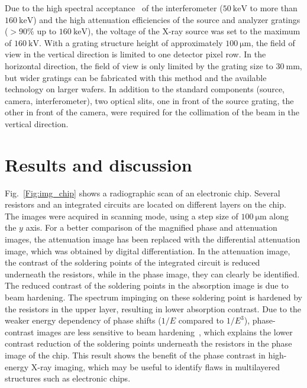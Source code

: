 \documentclass{pnastwo}
\begin{document}
\begin{article}
Due to the high spectral acceptance~\cite{Weitkamp2005,Thuering2013c} of the
interferometer ($\SI{50}{\kilo\electronvolt}$ to
more than $\SI{160}{\kilo\electronvolt}$) and the high attenuation efficiencies of
the source and analyzer gratings ($>90\%$ up to
$\SI{160}{\kilo\electronvolt}$), the voltage of the X-ray source was set to
the maximum of $\SI{160}{\kilo\volt}$. With a grating structure height of
approximately $\SI{100}{\micro \metre}$, the field of view in the vertical
direction is limited to one detector pixel row. In the horizontal direction,
the field of view is only limited by the grating size to
$\SI{30}{\milli\metre}$, but wider gratings can be fabricated with this
method and the available technology on larger wafers. In addition to the standard components (source,
camera, interferometer), two optical slits, one in front of the source
grating, the other in front of the camera, were required for the collimation
of the beam in the vertical direction. 

\section{Results and discussion}
Fig.~\ref{Fig:img_chip} shows a radiographic scan of an electronic chip.
Several resistors and an integrated circuits are located on different layers
on the chip. The images were acquired in scanning mode, using a step size of
$\SI{100}{\micro \metre}$ along the $y$ axis. For a better comparison of the
magnified phase and attenuation images, the attenuation image has been
replaced with the differential attenuation image, which was obtained by
digital differentiation. In the attenuation image, the contrast of the soldering points of
the integrated circuit is reduced underneath the resistors, while in
the phase image, they can clearly be identified. The reduced contrast of the 
soldering points in the absorption image is due to beam hardening. The spectrum
impinging on these soldering point is hardened by the resistors in the upper
layer, resulting in lower absorption contrast. Due to the weaker energy
dependency of phase shifts ($1/E$ compared to $1/E^3$), phase-contrast images
are less sensitive to beam hardening~\cite{Chabior2011a}, which explains the
lower contrast reduction of the soldering points underneath the resistors in the
phase image of the chip. This result shows the benefit of the phase contrast in
high-energy X-ray imaging, which may be useful to identify flaws in multilayered
structures such as electronic chips.


\end{article}
\end{document}
